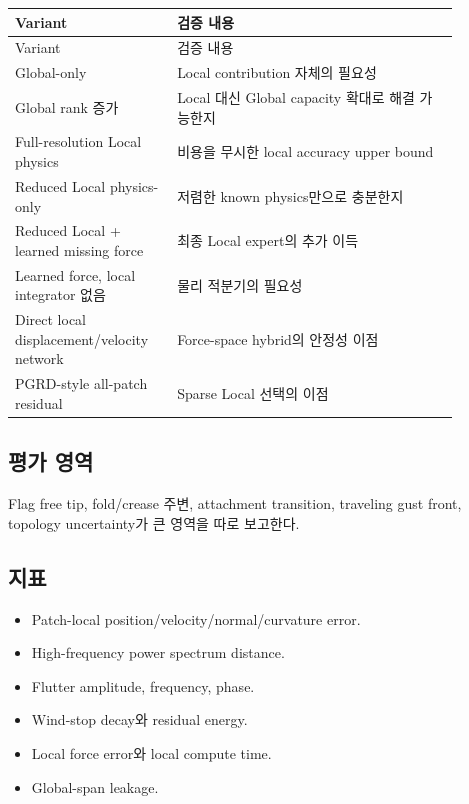 \documentclass[11pt,a4paper]{article}
\begin{document}
\begin{longtable}{L{0.30\linewidth}L{0.58\linewidth}}
\toprule
Variant & 검증 내용 \\
\midrule
\endfirsthead
\toprule
Variant & 검증 내용 \\
\midrule
\endhead
Global-only & Local contribution 자체의 필요성 \\
\addlinespace
Global rank 증가 & Local 대신 Global capacity 확대로 해결 가능한지 \\
\addlinespace
Full-resolution Local physics & 비용을 무시한 local accuracy upper bound \\
\addlinespace
Reduced Local physics-only & 저렴한 known physics만으로 충분한지 \\
\addlinespace
Reduced Local + learned missing force & 최종 Local expert의 추가 이득 \\
\addlinespace
Learned force, local integrator 없음 & 물리 적분기의 필요성 \\
\addlinespace
Direct local displacement/velocity network & Force-space hybrid의 안정성 이점 \\
\addlinespace
PGRD-style all-patch residual & Sparse Local 선택의 이점 \\
\bottomrule
\end{longtable}

\subsection*{평가 영역}

Flag free tip, fold/crease 주변, attachment transition,
traveling gust front, topology uncertainty가 큰 영역을 따로 보고한다.

\subsection*{지표}

\begin{itemize}[leftmargin=1.5em]
  \item Patch-local position/velocity/normal/curvature error.
  \item High-frequency power spectrum distance.
  \item Flutter amplitude, frequency, phase.
  \item Wind-stop decay와 residual energy.
  \item Local force error와 local compute time.
  \item Global-span leakage.
\end{itemize}
\end{document}
